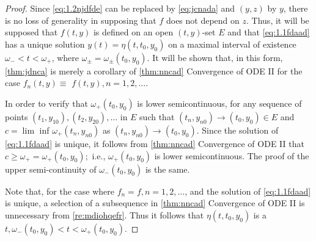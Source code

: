 \documentclass{article}
\begin{document}
\begin{proof}
Since \cref{eq:1.2njdfde} can be replaced by \cref{eq:jcnada} and $(y, z)$ by $y$, there is no loss of generality in supposing that $f$ does not depend on $z$. Thus, it will be supposed that $f(t, y)$ is defined on an open $(t, y)$-set $E$ and that \cref{eq:1.1fdaad} has a unique solution $y(t)=\eta\left(t, t_{0}, y_{0}\right)$ on a maximal interval of existence $\omega_{-}<t<\omega_{+}$, where $\omega_{\pm}=\omega_{\pm}\left(t_{0}, y_{0}\right) .$ It will be shown that, in this form, \cref{thm:jdnca} is merely a corollary of \cref{thm:nncad}  {Convergence of ODE II} for the case $f_{n}(t, y) \equiv$ $f(t, y), n=1,2, \ldots$.

 In order to verify that $\omega_{+}\left(t_{0}, y_{0}\right)$ is lower semicontinuous, for any sequence of points $\left(t_{1}, y_{10}\right),\left(t_{2}, y_{20}\right), \ldots$ in $E$ such that $\left(t_{n}, y_{n 0}\right) \rightarrow\left(t_{0}, y_{0}\right) \in E$ and $c=\lim$ inf $\omega_{+}\left(t_{n}, y_{n 0}\right)$ as $\left(t_{n}, y_{n 0}\right) \rightarrow\left(t_{0}, y_{0}\right) .$ Since the solution of \cref{eq:1.1fdaad} is unique, it follows from \cref{thm:nncad}  {Convergence of ODE II} that $c \ge \omega_{+}=\omega_{+}\left(t_{0}, y_{0}\right) ;$ i.e., $\omega_{+}\left(t_{0}, y_{0}\right)$ is lower semicontinuous. The proof of the upper semi-continuity of $\omega_{-}\left(t_{0}, y_{0}\right)$ is the same.

 Note that, for the case where $f_{n}=f, n=1,2, \ldots$, and the solution of \cref{eq:1.1fdaad} is unique, a selection of a subsequence in \cref{thm:nncad}  {Convergence of ODE II} is unnecessary from \cref{re:mdiohqefr}. Thus it follows that $\eta\left(t, t_{0}, y_{0}\right)$ is a  $t, \omega_{-}\left(t_{0}, y_{0}\right)<t<\omega_{+}\left(t_{0}, y_{0}\right)$. 


\end{proof}
\end{document}
